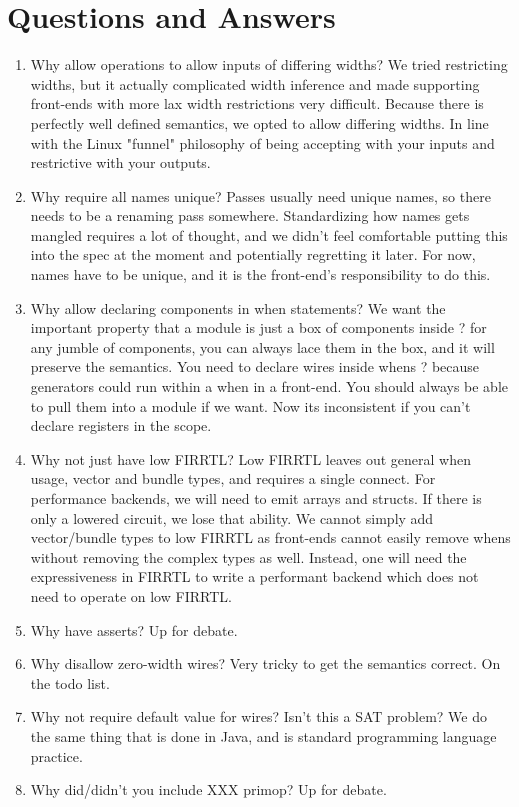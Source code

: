 \documentclass[12pt]{article}
\begin{document}
\section{Questions and Answers}
\begin{enumerate}[topsep=3pt,itemsep=-0.5ex,partopsep=1ex,parsep=1ex]
\item Why allow operations to allow inputs of differing widths? 
We tried restricting widths, but it actually complicated width inference and made supporting front-ends with more lax width restrictions very difficult.
Because there is perfectly well defined semantics, we opted to allow differing widths.
In line with the Linux "funnel" philosophy of being accepting with your inputs and restrictive with your outputs.

\item Why require all names unique?
Passes usually need unique names, so there needs to be a renaming pass somewhere.
Standardizing how names gets mangled requires a lot of thought, and we didn't feel comfortable putting this into the spec at the moment and potentially regretting it later.
For now, names have to be unique, and it is the front-end's responsibility to do this.

\item Why allow declaring components in when statements? 
We want the important property that a module is just a box of components inside ? for any jumble of components, you can always lace them in the box, and it will preserve the semantics.
You need to declare wires inside whens ? because generators could run within a when in a front-end.
You should always be able to pull them into a module if we want.
Now its inconsistent if you can't declare registers in the scope.

\item Why not just have low FIRRTL?
Low FIRRTL leaves out general when usage, vector and bundle types, and requires a single connect.
For performance backends, we will need to emit arrays and structs.
If there is only a lowered circuit, we lose that ability.
We cannot simply add vector/bundle types to low FIRRTL as front-ends cannot easily remove whens without removing the complex types as well.
Instead, one will need the expressiveness in FIRRTL to write a performant backend which does not need to operate on low FIRRTL.

\item Why have asserts? 
Up for debate.

\item Why disallow zero-width wires? 
Very tricky to get the semantics correct.
On the todo list.

\item Why not require default value for wires? Isn't this a SAT problem?
We do the same thing that is done in Java, and is standard programming language practice.

\item Why did/didn't you include XXX primop?
Up for debate.

\end{enumerate}
\end{document}
